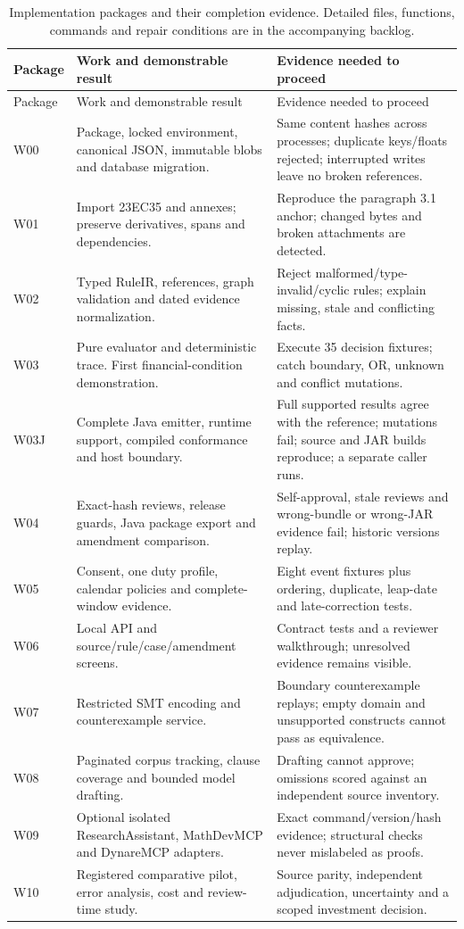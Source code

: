 \begingroup\small
\begin{longtable}{P{0.12\textwidth}P{0.42\textwidth}P{0.36\textwidth}}
\caption{Implementation packages and their completion evidence. Detailed files,
functions, commands and repair conditions are in the accompanying backlog.}\label{tab:phases}\\
\toprule Package & Work and demonstrable result & Evidence needed to proceed \\\midrule
\endfirsthead
\toprule Package & Work and demonstrable result & Evidence needed to proceed \\\midrule
\endhead
W00 & Package, locked environment, canonical JSON, immutable blobs and database migration. & Same content hashes across processes; duplicate keys/floats rejected; interrupted writes leave no broken references.\\
W01 & Import 23EC35 and annexes; preserve derivatives, spans and dependencies. & Reproduce the paragraph 3.1 anchor; changed bytes and broken attachments are detected.\\
W02 & Typed RuleIR, references, graph validation and dated evidence normalization. & Reject malformed/type-invalid/cyclic rules; explain missing, stale and conflicting facts.\\
W03 & Pure evaluator and deterministic trace. First financial-condition demonstration. & Execute 35 decision fixtures; catch boundary, OR, unknown and conflict mutations.\\
W03J & Complete Java emitter, runtime support, compiled conformance and host boundary. & Full supported results agree with the reference; mutations fail; source and JAR builds reproduce; a separate caller runs.\\
W04 & Exact-hash reviews, release guards, Java package export and amendment comparison. & Self-approval, stale reviews and wrong-bundle or wrong-JAR evidence fail; historic versions replay.\\
W05 & Consent, one duty profile, calendar policies and complete-window evidence. & Eight event fixtures plus ordering, duplicate, leap-date and late-correction tests.\\
W06 & Local API and source/rule/case/amendment screens. & Contract tests and a reviewer walkthrough; unresolved evidence remains visible.\\
W07 & Restricted SMT encoding and counterexample service. & Boundary counterexample replays; empty domain and unsupported constructs cannot pass as equivalence.\\
W08 & Paginated corpus tracking, clause coverage and bounded model drafting. & Drafting cannot approve; omissions scored against an independent source inventory.\\
W09 & Optional isolated ResearchAssistant, MathDevMCP and DynareMCP adapters. & Exact command/version/hash evidence; structural checks never mislabeled as proofs.\\
W10 & Registered comparative pilot, error analysis, cost and review-time study. & Source parity, independent adjudication, uncertainty and a scoped investment decision.\\
\bottomrule
\end{longtable}
\endgroup

